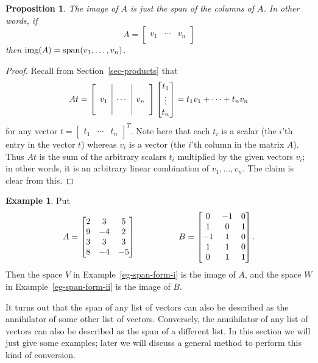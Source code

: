 \documentclass[reqno]{amsart}
\newtheorem{proposition}[theorem]{Proposition}
\theoremstyle{definition}
\newtheorem{example}[theorem]{Example}
\begin{document}
\begin{proposition}\label{prop-img-span}
 The image of $A$ is just the span of the columns of $A$.  In other
 words, if 
 \[ A = \left[\begin{array}{c|c|c}
        && \\ v_1 & \dotsb & v_n \\ &&
       \end{array}\right]
 \]
 then $\operatorname{img}(A)=\operatorname{span}(v_1,\dotsc,v_n)$.
\end{proposition}
\begin{proof}
 Recall from Section~\ref{sec-products} that 
 \[ At = 
       \left[\begin{array}{c|c|c}
        && \\ v_1 & \dotsb & v_n \\ &&
       \end{array}\right] 
       \left[\begin{matrix} t_1 \\ \vdots \\ t_n \end{matrix}\right]
       = 
       t_1v_1 + \dotsb + t_nv_n
 \]
 for any vector $t = \begin{bmatrix} t_1 & \dotsb & t_n \end{bmatrix}^T$.
 Note here that each $t_i$ is a scalar (the $i$'th entry in the vector
 $t$) whereas $v_i$ is a vector (the $i$'th column in the matrix
 $A$).  Thus $At$ is the sum of the arbitrary scalars $t_i$ multiplied
 by the given vectors $v_i$; in other words, it is an arbitrary linear
 combination of $v_1,\dotsc,v_n$.  The claim is clear from this.
\end{proof}

\begin{example}\label{eg-img-span}
 Put
 \[ A =
    \left[\begin{matrix}
      2 &  3 &  5 \\
      9 & -4 &  2 \\
      3 &  3 &  3 \\
      8 & -4 & -5
    \end{matrix}\right]
    \hspace{5em}
    B = 
    \left[\begin{matrix}
      0 & -1 &  0 \\
      1 &  0 &  1 \\
     -1 &  1 &  0 \\
      1 &  1 &  0 \\
      0 &  1 &  1
    \end{matrix}\right]. 
 \]
 Then the space $V$ in Example~\ref{eg-span-form-i} is the image of
 $A$, and the space $W$ in Example~\ref{eg-span-form-ii} is the image
 of $B$.
\end{example}

It turns out that the span of any list of vectors can also be
described as the annihilator of some other list of vectors.  Conversely, the
annihilator of any list of vectors can also be described as the span
of a different list.  In this section we will just give some examples;
later we will discuss a general method to perform this kind of
conversion.
\end{document}
